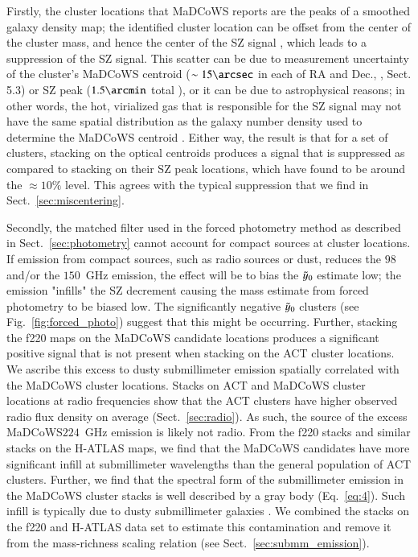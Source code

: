 \documentclass[longauth]{aa} %
\newcommand{\madcows}{MaDCoWS\xspace}
\newcommand{\yc}{$\Tilde{\vary}_0$\xspace}
\begin{document}
Firstly, the cluster locations that MaDCoWS reports are the peaks of a smoothed galaxy density map; the identified cluster location can be offset from the center of the cluster mass, and hence the center of the SZ signal \citep{George2012, Sehgal2013, Viola2015}, which leads to a suppression of the SZ signal. This scatter can be due to measurement uncertainty of the cluster's MaDCoWS centroid ($\sim 15 \arcsec$ in each of RA and Dec., \citealt{Gonzalez2019}, Sect. 5.3) or SZ peak ($1.5\arcmin$ total \citealt{Hilton2021}), or it can be due to astrophysical reasons; in other words, the hot, virialized gas that is responsible for the SZ signal may not have the same spatial distribution as the galaxy number density used to determine the MaDCoWS centroid \citep{George2012, Sehgal2013, Viola2015}. Either way, the result is that for a set of clusters, stacking on the optical centroids produces a signal that is suppressed as compared to stacking on their SZ peak locations, which \citet{Ge2019} have found to be around the $\approx 10\%$ level. This agrees with the typical suppression that we find in Sect.~\ref{sec:miscentering}.

Secondly, the matched filter used in the forced photometry method as described in Sect.~\ref{sec:photometry} cannot account for compact sources at cluster locations.
If emission from compact sources, such as radio sources or dust, reduces the $98$ and/or the $150$~GHz emission, the effect will be to bias the \yc estimate low; the emission "infills" the SZ decrement causing the mass estimate from forced photometry to be biased low. The significantly negative \yc clusters (see Fig.~\ref{fig:forced_photo}) suggest that this might be occurring. Further, stacking the f220 maps on the \madcows candidate locations produces a significant positive signal that is not present when stacking on the ACT cluster locations. We ascribe this excess to dusty submillimeter emission spatially correlated with the \madcows cluster locations. Stacks on ACT and \madcows cluster locations at radio frequencies show that the ACT clusters have higher observed radio flux density on average (Sect.~\ref{sec:radio}). As such, the source of the excess \madcows $224$~GHz emission is likely not radio. From the f220 stacks and similar stacks on the H-ATLAS maps, we find that the MaDCoWS candidates have more significant infill at submillimeter wavelengths than the general population of ACT clusters. Further, we find that the spectral form of the submillimeter emission in the \madcows cluster stacks is well described by a gray body (Eq.~\ref{eq:4}). Such infill is typically due to dusty submillimeter galaxies \citep[e.g.,][]{Casey2014}.  We combined the stacks on the f220 and H-ATLAS data set to estimate this contamination and remove it from the mass-richness scaling relation (see Sect.~\ref{sec:submm_emission}).
\end{document}
